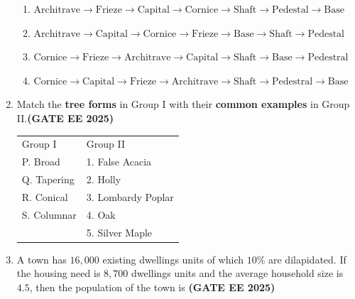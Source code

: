\documentclass[journal,12pt,onecolumn]{IEEEtran}
\theoremstyle{remark}
\begin{document}
\begin{enumerate}
\begin{enumerate}
    \item $\text{Architrave} \longrightarrow\text{Frieze}\longrightarrow\text{Capital}\longrightarrow\text{Cornice}\longrightarrow\text{Shaft}\longrightarrow\text{Pedestal}\longrightarrow\text{Base}$
    \item $\text{Architrave}\longrightarrow\text{Capital}\longrightarrow\text{Cornice}\longrightarrow\text{Frieze}\longrightarrow\text{Base}\longrightarrow\text{Shaft}\longrightarrow\text{Pedestal}$
    \item $\text{Cornice}\longrightarrow\text{Frieze}\longrightarrow\text{Architrave}\longrightarrow\text{Capital}\longrightarrow\text{Shaft}\longrightarrow\text{Base}\longrightarrow\text{Pedestral}$
    \item $\text{Cornice}\longrightarrow\text{Capital}\longrightarrow\text{Frieze}\longrightarrow\text{Architrave}\longrightarrow\text{Shaft}\longrightarrow\text{Pedestral}\longrightarrow\text{Base}$
\end{enumerate}
\item  Match the \textbf{tree forms} in Group I with their \textbf{common examples} in Group II.\hfill \textbf{(GATE EE 2025)}
\newline
\begin{tabular}{p{}p{}}
  Group I   & Group II \\
 P. Broad    & 1. False Acacia\\
 Q. Tapering & 2. Holly\\
 R. Conical & 3. Lombardy Poplar\\
 S. Columnar & 4. Oak\\
   & 5. Silver Maple\\
\end{tabular}
\begin{enumerate}
\end{enumerate}
\item A town has $16,000$ existing dwellings units of which $10\%$ are dilapidated. If the housing need is $8,700$ dwellings units and the average household size is $4.5$, then the population of the town is \hfill \textbf{(GATE EE 2025)}

\end{enumerate}
\end{document}

